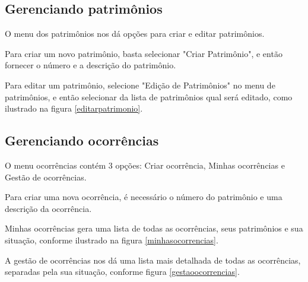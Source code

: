 \documentclass[
	12pt,				%
	openright,			%
	oneside,			%
	a4paper,			%
	english,			%
	french,				%
	spanish,			%
	brazil				%
	]{abntex2}
\begin{document}
\subsection{Gerenciando patrimônios}

O menu dos patrimônios nos dá opções para criar e editar patrimônios.

Para criar um novo patrimônio, basta selecionar "Criar Patrimônio", e então fornecer o número e a descrição do patrimônio.

Para editar um patrimônio, selecione "Edição de Patrimônios" no menu de patrimônios, e então selecionar da lista de patrimônios qual será editado, como ilustrado na figura \ref{editarpatrimonio}.


\subsection{Gerenciando ocorrências}

O menu ocorrências contém 3 opções: Criar ocorrência, Minhas ocorrências e Gestão de ocorrências. 

Para criar uma nova ocorrência, é necessário o número do patrimônio e uma descrição da ocorrência.

Minhas ocorrências gera uma lista de todas as ocorrências, seus patrimônios e sua situação, conforme ilustrado na figura \ref{minhasocorrencias}.




A gestão de ocorrências nos dá uma lista mais detalhada de todas as ocorrências, separadas pela sua situação, conforme figura \ref{gestaoocorrencias}.

\end{document}
